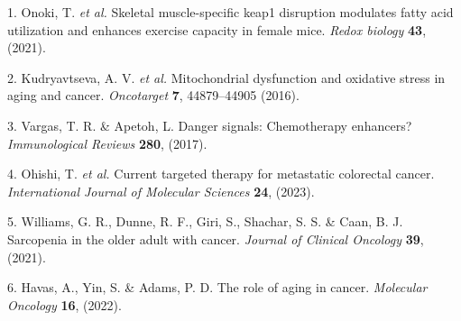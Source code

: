 \documentclass[
]{article}
\newenvironment{cslreferences}%
  {}%
  {\par}
\begin{document}
\hypertarget{refs}{}
\begin{cslreferences}
\leavevmode\hypertarget{ref-SkeletalMuscleOnoki2021}{}%
1. Onoki, T. \emph{et al.} Skeletal muscle-specific keap1 disruption modulates fatty acid utilization and enhances exercise capacity in female mice. \emph{Redox biology} \textbf{43}, (2021).

\leavevmode\hypertarget{ref-MitochondrialDKudrya2016}{}%
2. Kudryavtseva, A. V. \emph{et al.} Mitochondrial dysfunction and oxidative stress in aging and cancer. \emph{Oncotarget} \textbf{7}, 44879--44905 (2016).

\leavevmode\hypertarget{ref-DangerSignalsVargas2017}{}%
3. Vargas, T. R. \& Apetoh, L. Danger signals: Chemotherapy enhancers? \emph{Immunological Reviews} \textbf{280}, (2017).

\leavevmode\hypertarget{ref-CurrentTargeteOhishi2023}{}%
4. Ohishi, T. \emph{et al.} Current targeted therapy for metastatic colorectal cancer. \emph{International Journal of Molecular Sciences} \textbf{24}, (2023).

\leavevmode\hypertarget{ref-SarcopeniaInTWillia2021}{}%
5. Williams, G. R., Dunne, R. F., Giri, S., Shachar, S. S. \& Caan, B. J. Sarcopenia in the older adult with cancer. \emph{Journal of Clinical Oncology} \textbf{39}, (2021).

\leavevmode\hypertarget{ref-TheRoleOfAgiHavas2022}{}%
6. Havas, A., Yin, S. \& Adams, P. D. The role of aging in cancer. \emph{Molecular Oncology} \textbf{16}, (2022).
\end{cslreferences}
\end{document}
